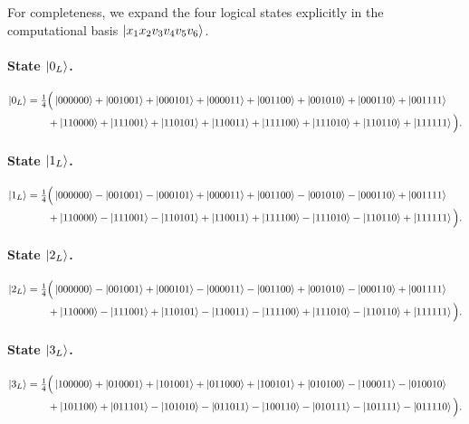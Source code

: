 \documentclass[pdflatex,sn-nature]{sn-jnl}%
\theoremstyle{thmstyleone}%
\theoremstyle{thmstyletwo}%
\theoremstyle{thmstylethree}%
\begin{document}
\begin{appendices}
For completeness, we expand the four logical states explicitly in the computational basis $\ket{x_1x_2v_3v_4v_5v_6}$.

\paragraph{State $\ket{0_L}$.}
\begin{align*}
    \ket{0_L}
     & =\tfrac{1}{4}\Big(\ket{000000}+\ket{001001}+\ket{000101}+\ket{000011}
    +\ket{001100}+\ket{001010}+\ket{000110}+\ket{001111} \\
     & \qquad +\ket{110000}+\ket{111001}+\ket{110101}+\ket{110011}
    +\ket{111100}+\ket{111010}+\ket{110110}+\ket{111111}\Big).
\end{align*}

\paragraph{State $\ket{1_L}$.}
\begin{align*}
    \ket{1_L}
     & =\tfrac{1}{4}\Big(\ket{000000}-\ket{001001}-\ket{000101}+\ket{000011}
    +\ket{001100}-\ket{001010}-\ket{000110}+\ket{001111} \\
     & \qquad +\ket{110000}-\ket{111001}-\ket{110101}+\ket{110011}
    +\ket{111100}-\ket{111010}-\ket{110110}+\ket{111111}\Big).
\end{align*}

\paragraph{State $\ket{2_L}$.}
\begin{align*}
    \ket{2_L}
     & =\tfrac{1}{4}\Big(\ket{000000}-\ket{001001}+\ket{000101}-\ket{000011}
    -\ket{001100}+\ket{001010}-\ket{000110}+\ket{001111} \\
     & \qquad +\ket{110000}-\ket{111001}+\ket{110101}-\ket{110011}
    -\ket{111100}+\ket{111010}-\ket{110110}+\ket{111111}\Big).
\end{align*}

\paragraph{State $\ket{3_L}$.}
\begin{align*}
    \ket{3_L}
     & =\tfrac{1}{4}\Big(\ket{100000}+\ket{010001}
    +\ket{101001}+\ket{011000}
    +\ket{100101}+\ket{010100}
    -\ket{100011}-\ket{010010} \\
     & \qquad +\ket{101100}+\ket{011101}
    -\ket{101010}-\ket{011011}
    -\ket{100110}-\ket{010111}
    -\ket{101111}-\ket{011110}\Big).
\end{align*}


\end{appendices}
\end{document}
